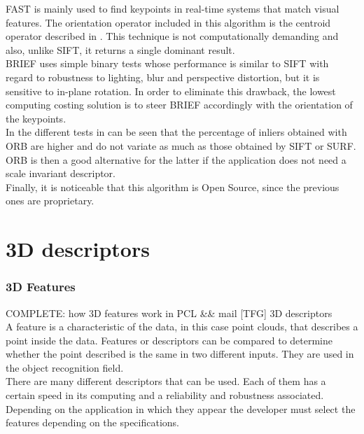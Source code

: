 FAST is mainly used to find keypoints in real-time systems that match visual features. The orientation operator included in this algorithm is the centroid operator described in \cite{orientation_corners}. This technique is not computationally demanding and also, unlike SIFT, it returns a single dominant result. 
\\

BRIEF uses simple binary tests whose performance is similar to SIFT with regard to robustness to lighting, blur and perspective distortion, but it is sensitive to in-plane rotation. In order to eliminate this drawback, the lowest computing costing solution is to steer BRIEF accordingly with the orientation of the keypoints. 
\\

In the different tests in \cite{orb} can be seen that the percentage of inliers obtained with ORB are higher and do not variate as much as those obtained by SIFT or SURF. 
ORB is then a good alternative for the latter if the application does not need a scale invariant descriptor. 
\\

Finally, it is noticeable that this algorithm is Open Source, since the previous ones are proprietary. 


\section{3D descriptors}

\subsubsection{3D Features}
\label{3d_features}
COMPLETE: how 3D features work in PCL  &&  mail [TFG] 3D descriptors
\\

A feature is a characteristic of the data, in this case point clouds, that describes a point inside the data. Features or descriptors can be compared to determine whether the point described is the same in two different inputs. They are used in the object recognition field. 
\\

There are many different descriptors that can be used. Each of them has a certain speed in its computing and a reliability and robustness associated. Depending on the application in which they appear the developer must select the features depending on the specifications. 
\\

